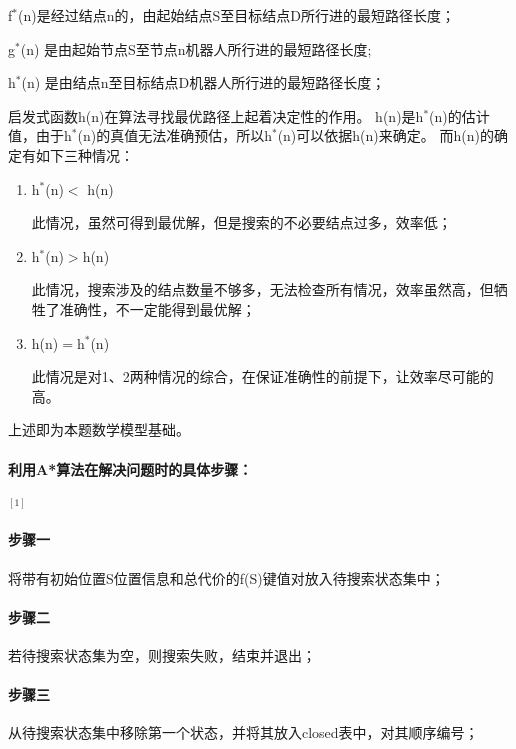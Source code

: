 \documentclass[withoutpreface,bwprint]{cumcmthesis} %
\begin{document}
\hspace*{0.7cm}
f$^*$(n)是经过结点n的，由起始结点S至目标结点D所行进的最短路径长度；

\hspace*{0.5cm}
g$^*$(n) 是由起始节点S至节点n机器人所行进的最短路径长度;

\hspace*{0.5cm}
h$^*$(n) 是由结点n至目标结点D机器人所行进的最短路径长度；

\hspace*{0.5cm}

启发式函数h(n)在算法寻找最优路径上起着决定性的作用。
h(n)是h$^*$(n)的估计值，由于h$^*$(n)的真值无法准确预估，所以h$^*$(n)可以依据h(n)来确定。
而h(n)的确定有如下三种情况：

\begin{enumerate}[itemindent=1em] 
    \renewcommand{\labelenumi}{\theenumi.}
    
    \item h$^*$(n)$<$ h(n)
    
    此情况，虽然可得到最优解，但是搜索的不必要结点过多，效率低；
    
    \item h$^*$(n)$>$h(n)
    
    此情况，搜索涉及的结点数量不够多，无法检查所有情况，效率虽然高，但牺牲了准确性，不一定能得到最优解；
    
    \item  h(n)$=$h$^*$(n)
    
    此情况是对1、2两种情况的综合，在保证准确性的前提下，让效率尽可能的高。
\end{enumerate}

上述即为本题数学模型基础。
\paragraph{利用A*算法在解决问题时的具体步骤：}$^{[1]}$
\paragraph{步骤一}
将带有初始位置S位置信息和总代价的f(S)键值对放入待搜索状态集中；

\paragraph{步骤二}
若待搜索状态集为空，则搜索失败，结束并退出；

\paragraph{步骤三}
从待搜索状态集中移除第一个状态，并将其放入closed表中，对其顺序编号；
\end{document}
